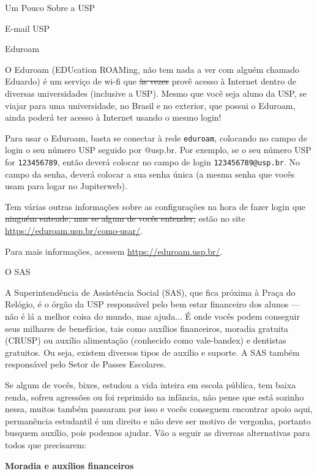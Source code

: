 \begin{secao}{Um Pouco Sobre a USP}
\begin{subsecao}{E-mail USP}
\end{subsecao}

\begin{subsecao}{Eduroam}

O Eduroam (EDUcation ROAMing, não tem nada a ver com alguém chamado Eduardo) é um
serviço de wi-fi que \sout{às vezes} provê acesso à Internet dentro de diversas
universidades (inclusive a USP). Mesmo que você seja aluno da USP, se viajar para
uma universidade, no Brasil e no exterior, que possui o Eduroam, ainda poderá ter
acesso à Internet usando o mesmo login!

Para usar o Eduroam, basta se conectar à rede \texttt{eduroam}, colocando no campo
de login o seu número USP seguido por @usp.br. Por exemplo, se o seu número USP for
\texttt{123456789}, então deverá colocar no campo de login \texttt{123456789@usp.br}.
No campo da senha, deverá colocar a sua senha única (a mesma senha que vocês usam
para logar no Jupiterweb).

Tem várias outras informações sobre as configurações na hora de fazer login que
\sout{ninguém entende, mas se algum de vocês entender,} estão no site
\url{https://eduroam.usp.br/como-usar/}.

Para mais informações, acessem \url{https://eduroam.usp.br/}.

\end{subsecao}

\begin{subsecao}{O SAS}

A Superintendência de Assistência Social (SAS), que fica próxima à Praça do
Relógio, é o órgão da USP responsável pelo bem estar financeiro dos alunos — não
é lá a melhor coisa do mundo, mas ajuda... É onde vocês podem conseguir seus
milhares de benefícios, tais como auxílios financeiros, moradia gratuita (CRUSP)
ou auxílio alimentação (conhecido como vale-bandex) e dentistas gratuitos. Ou
seja, existem diversos tipos de auxílio e suporte. A SAS também responsável pelo
Setor de Passes Escolares.

Se algum de vocês, bixes, estudou a vida inteira em escola pública, tem baixa renda,
sofreu agressões ou foi reprimido na infância, não pense que está sozinho nessa,
muitos também passaram por isso e vocês conseguem encontrar apoio aqui, permanência
estudantil é um direito e não deve ser motivo de vergonha, portanto busquem
auxílio, pois podemos ajudar. Vão a seguir as diversas alternativas para todos 
que precisarem:

{\bf Moradia e auxílios financeiros}


\end{subsecao}
\end{secao}
